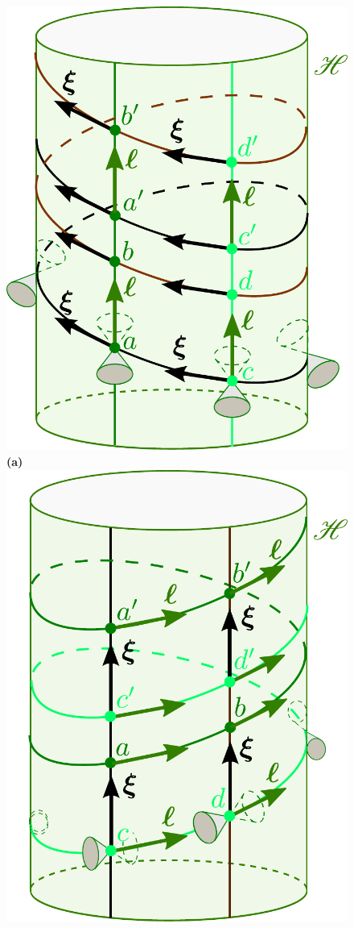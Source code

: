 \begin{figure}
\centerline{\includegraphics[height=0.4\textheight]{sta_rot_horizon_gen.pdf}
\textbf{\large (a)}
\quad\includegraphics[height=0.4\textheight]{sta_rot_horizon_kil.pdf}
}
\end{figure}
